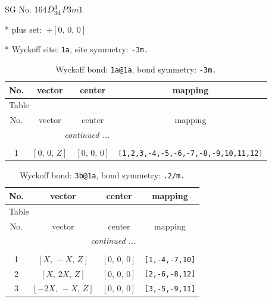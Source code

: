 \documentclass[fleqn,8pt]{jsarticle}
\begin{document}
\setcounter{MaxMatrixCols}{32}

\renewcommand{\tablename}{Table~}
\renewcommand{\figurename}{Figure~}
\begin{center}
\LARGE
SG No. 164\quad$D_{\rm 3d}^{3}$\quad$P\bar{3}m1$\quad[ trigonal ]
\end{center}

* plus set:\,\,\,$+\left[ 0,\, 0,\, 0 \right]$


* Wyckoff site: {\tt 1a}, site symmetry: {\tt -3m.}
\renewcommand{\arraystretch}{1.2}
\begin{longtable}{cccc}
\caption{Wyckoff bond: {\tt 1a@1a}, bond symmetry: {\tt -3m.}}
 \\
 \hline \hline
No. & vector & center & mapping \\ \hline \endfirsthead

\multicolumn{3}{l}{\tablename\ \thetable{}} \\
 \hline \hline
No. & vector & center & mapping \\ \hline \endhead

 \hline \hline
\multicolumn{3}{r}{\footnotesize\it continued ...} \\ \endfoot

 \hline \hline
\multicolumn{3}{r}{} \\ \endlastfoot

1 & $\left[ 0,\, 0,\, Z \right]$ & $\left[ 0,\, 0,\, 0 \right]$ & {\tt [1,2,3,-4,-5,-6,-7,-8,-9,10,11,12]} \\
\end{longtable}
\renewcommand{\arraystretch}{1.2}
\begin{longtable}{cccc}
\caption{Wyckoff bond: {\tt 3b@1a}, bond symmetry: {\tt .2/m.}}
 \\
 \hline \hline
No. & vector & center & mapping \\ \hline \endfirsthead

\multicolumn{3}{l}{\tablename\ \thetable{}} \\
 \hline \hline
No. & vector & center & mapping \\ \hline \endhead

 \hline \hline
\multicolumn{3}{r}{\footnotesize\it continued ...} \\ \endfoot

 \hline \hline
\multicolumn{3}{r}{} \\ \endlastfoot

1 & $\left[ X,\, - X,\, Z \right]$ & $\left[ 0,\, 0,\, 0 \right]$ & {\tt [1,-4,-7,10]} \\ \hline
2 & $\left[ X,\, 2 X,\, Z \right]$ & $\left[ 0,\, 0,\, 0 \right]$ & {\tt [2,-6,-8,12]} \\ \hline
3 & $\left[ - 2 X,\, - X,\, Z \right]$ & $\left[ 0,\, 0,\, 0 \right]$ & {\tt [3,-5,-9,11]} \\
\end{longtable}
\end{document}
